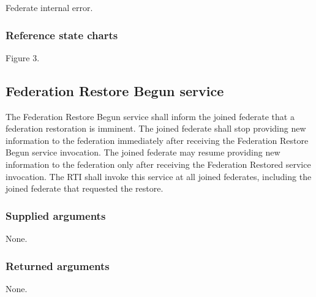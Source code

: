\begin{stdalphalist}
    \item Federate internal error.
\end{stdalphalist}

\subsubsection{Reference state charts}

\begin{stdalphalist}
    \item Figure 3.
\end{stdalphalist}

\clearpage


\subsection{Federation Restore Begun \rtiinitiated{} service}

The Federation Restore Begun \rtiinitiated{} service shall inform the joined federate that a federation restoration is imminent. The joined federate shall stop providing new information to the federation immediately after receiving the Federation Restore Begun \rtiinitiated{} service invocation. The joined federate may resume providing new information to the federation only after receiving the Federation Restored \rtiinitiated{} service invocation. The RTI shall invoke this service at all joined federates, including the joined federate that requested the restore.

\subsubsection{Supplied arguments}

\begin{stdalphalist}
    \item None.
\end{stdalphalist}

\subsubsection{Returned arguments}

\begin{stdalphalist}
    \item None.
\end{stdalphalist}

